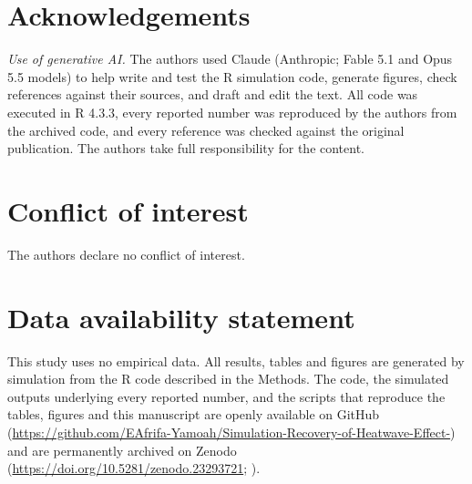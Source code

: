 \documentclass[11pt,a4paper]{article}
\begin{document}
\section*{Acknowledgements}

\noindent\textit{Use of generative AI.} The authors used Claude (Anthropic; Fable 5.1 and Opus 5.5 models) to help write and test the R simulation code, generate figures, check references against their sources, and draft and edit the text. All code was executed in R 4.3.3, every reported number was reproduced by the authors from the archived code, and every reference was checked against the original publication. The authors take full responsibility for the content.

\section*{Conflict of interest}
The authors declare no conflict of interest.

\section*{Data availability statement}
This study uses no empirical data. All results, tables and figures are generated by simulation from the R code described in the Methods. The code, the simulated outputs underlying every reported number, and the scripts that reproduce the tables, figures and this manuscript are openly available on GitHub (\url{https://github.com/EAfrifa-Yamoah/Simulation-Recovery-of-Heatwave-Effect-}) and are permanently archived on Zenodo (\url{https://doi.org/10.5281/zenodo.23293721}; \citealp{awuah2026}).
\end{document}
